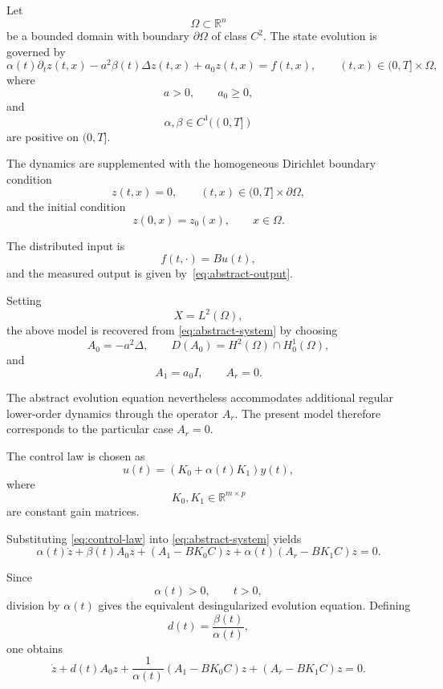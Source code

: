 \documentclass[pdflatex,sn-mathphys-num]{sn-jnl}
\theoremstyle{thmstyleone}%
\theoremstyle{thmstyletwo}%
\theoremstyle{thmstylethree}%
\begin{document}
Let
\[
\Omega\subset\mathbb{R}^{n}
\]
be a bounded domain with boundary \(\partial\Omega\)
of class \(C^{2}\).
The state evolution is governed by
\begin{equation}
\alpha(t)\partial_t z(t,x)
-
a^{2}\beta(t)\Delta z(t,x)
+
a_{0}z(t,x)
=
f(t,x),
\qquad
(t,x)\in(0,T]\times\Omega,
\label{eq:parabolic-model}
\end{equation}
where
\[
a>0,
\qquad
a_{0}\ge0,
\]
and
\[
\alpha,\beta\in C^{1}((0,T])
\]
are positive on
\((0,T]\).

The dynamics are supplemented with the homogeneous Dirichlet boundary condition
\begin{equation}
z(t,x)=0,
\qquad
(t,x)\in(0,T]\times\partial\Omega,
\label{eq:boundary-condition}
\end{equation}
and the initial condition
\begin{equation}
z(0,x)=z_{0}(x),
\qquad
x\in\Omega.
\label{eq:initial-condition}
\end{equation}

The distributed input is
\[
f(t,\cdot)=Bu(t),
\]
and the measured output is given by~\eqref{eq:abstract-output}.

Setting
\[
X=L^{2}(\Omega),
\]
the above model is recovered from \eqref{eq:abstract-system}
by choosing
\[
A_{0}
=
-a^{2}\Delta,
\qquad
D(A_{0})
=
H^{2}(\Omega)\cap H_{0}^{1}(\Omega),
\]
and
\[
A_{1}=a_{0}I,
\qquad
A_{r}=0.
\]

The abstract evolution equation nevertheless accommodates additional regular lower-order dynamics through the operator \(A_r\).
The present model therefore corresponds to the particular case \(A_r=0\).

The control law is chosen as
\begin{equation}
u(t)
=
\left(
K_{0}
+
\alpha(t)K_{1}
\right)
y(t),
\label{eq:control-law}
\end{equation}
where
\[
K_{0},K_{1}\in\mathbb R^{m\times p}
\]
are constant gain matrices.

Substituting \eqref{eq:control-law}
into \eqref{eq:abstract-system}
yields
\begin{equation}
\alpha(t)\dot z
+
\beta(t)A_{0}z
+
\left(
A_{1}-BK_{0}C
\right)z
+
\alpha(t)
\left(
A_{r}-BK_{1}C
\right)z
=
0.
\label{eq:closed-loop-before-desingularization}
\end{equation}

Since
\[
\alpha(t)>0,
\qquad
t>0,
\]
division by \(\alpha(t)\) gives the equivalent desingularized evolution equation. Defining
\begin{equation}
d(t)
=
\frac{\beta(t)}{\alpha(t)},
\label{eq:d-definition}
\end{equation}
one obtains
\begin{equation}
\dot z
+
d(t)A_{0}z
+
\frac{1}{\alpha(t)}
\left(
A_{1}-BK_{0}C
\right)z
+
\left(
A_{r}-BK_{1}C
\right)z
=
0.
\label{eq:closed-loop-singular}
\end{equation}
\end{document}
